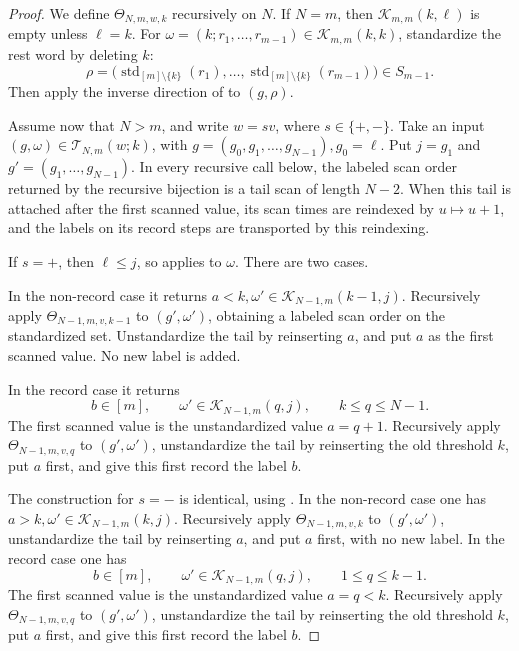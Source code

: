 \documentclass[11pt,letterpaper,reqno]{amsart}
\theoremstyle{definition}
\begin{document}
\begin{proof}
We define \(\Theta_{N,m,w,k}\) recursively on \(N\).  If \(N=m\), then
\(\mathcal K_{m,m}(k,\ell)\) is empty unless \(\ell=k\).  For $\omega=(k;r_1,\ldots,r_{m-1})\in\mathcal K_{m,m}(k,k)$, standardize the rest word by deleting \(k\):
\[
\rho=
\bigl(\operatorname{std}_{[m]\setminus\{k\}}(r_1),
\ldots,
\operatorname{std}_{[m]\setminus\{k\}}(r_{m-1})\bigr)
\in S_{m-1}.
\]
Then apply the inverse direction of  to
\((g,\rho)\).

Assume now that \(N>m\), and write \(w=sv\), where \(s\in\{+,-\}\).  Take an
input \((g,\omega)\in\mathcal T_{N,m}(w;k)\), with $g=(g_0,g_1,\ldots,g_{N-1}), g_0=\ell$. Put \(j=g_1\) and \(g'=(g_1,\ldots,g_{N-1})\).  In every recursive call below,
the labeled scan order returned by the recursive bijection is a tail scan of
length \(N-2\).  When this tail is attached after the first scanned value, its
scan times are reindexed by \(u\mapsto u+1\), and the labels on its record
steps are transported by this reindexing.

If \(s=+\), then
\(\ell\le j\), so  applies to \(\omega\).
There are two cases.

In the non-record case it returns $a<k, \omega'\in\mathcal K_{N-1,m}(k-1,j)$. Recursively apply \(\Theta_{N-1,m,v,k-1}\) to \((g',\omega')\), obtaining a labeled scan order on the standardized set. Unstandardize the tail by
reinserting \(a\), and put \(a\) as the first scanned value.  No new label is
added.

In the record case it returns
\[
b\in[m],\qquad
\omega'\in\mathcal K_{N-1,m}(q,j),
\qquad k\le q\le N-1.
\]
The first scanned value is the unstandardized value \(a=q+1\).  Recursively
apply \(\Theta_{N-1,m,v,q}\) to \((g',\omega')\), unstandardize the tail by
reinserting the old threshold \(k\), put \(a\) first, and give this first
record the label \(b\).

The construction for \(s=-\) is identical, using
.  In the non-record case one has $a>k, \omega'\in\mathcal K_{N-1,m}(k,j)$. Recursively apply \(\Theta_{N-1,m,v,k}\) to \((g',\omega')\), unstandardize the
tail by reinserting \(a\), and put \(a\) first, with no new label.  In the
record case one has
\[
b\in[m],\qquad
\omega'\in\mathcal K_{N-1,m}(q,j),
\qquad 1\le q\le k-1.
\]
The first scanned value is the unstandardized value \(a=q<k\).  Recursively
apply \(\Theta_{N-1,m,v,q}\) to \((g',\omega')\), unstandardize the tail by
reinserting the old threshold \(k\), put \(a\) first, and give this first
record the label \(b\).


\end{proof}
\end{document}
